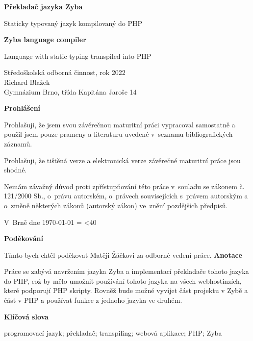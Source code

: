 \documentclass[a4paper,12pt]{article}
\author{Richard Blažek}
\makeatletter
\newcommand{\repeatchar}[2]{
  \begingroup
  \my@repeat@count=\z@
  \@whilenum\my@repeat@count<#1\do{#2\advance\my@repeat@count\@ne}
  \endgroup
}
\makeatother
\begin{document}
\begin{titlepage}
    \begin{center}

	\vspace*{3.5cm}            
	\Huge
	\textbf{Překladač jazyka Zyba}
            
	\vspace{0.5cm}
	\LARGE
	Staticky typovaný jazyk kompilovaný do PHP
        
	\vspace*{1.5cm}
	\Huge
	\textbf{Zyba language compiler}
            
	\vspace{0.5cm}
	\LARGE
	Language with static typing transpiled into PHP
            
	\vfill
            
	\large
        Středoškolská odborná činnost, rok 2022\\
	Richard Blažek\\
	Gymnázium Brno, třída Kapitána Jaroše 14
    \end{center}
\end{titlepage}
\thispagestyle{empty}
\Large\textbf{Prohlášení}\normalsize

Prohlašuji, že jsem svou závěrečnou maturitní práci vypracoval samostatně a použil jsem pouze prameny a literaturu uvedené v~seznamu bibliografických záznamů.

Prohlašuji, že tištěná verze a elektronická verze závěrečné maturitní práce jsou shodné.

Nemám závažný důvod proti zpřístupňování této práce v~souladu se zákonem č. 121/2000 Sb., o~právu autorském, o~právech souvisejících s~právem autorským a o~změně některých zákonů (autorský zákon) ve~znění pozdějších předpisů. 

V~Brně dne \today{} \repeatchar{40}{.}
\newpage
\thispagestyle{empty}
\Large\textbf{Poděkování}\normalsize

Tímto bych chtěl poděkovat Matěji Žáčkovi za odborné vedení práce.
\newpage
\thispagestyle{empty}
\Large\textbf{Anotace}\normalsize

Práce se zabývá navržením jazyka Zyba a implementací překladače tohoto jazyka do PHP, což by mělo umožnit používání tohoto jazyka na všech webhostinzích, které podporují PHP skripty. Rovněž bude možné vyvíjet část projektu v Zybě a část v PHP a používat funkce z jednoho jazyka ve druhém.

\Large\textbf{Klíčová slova}\normalsize

programovací jazyk; překladač; transpiling; webová aplikace; PHP; Zyba
\end{document}
